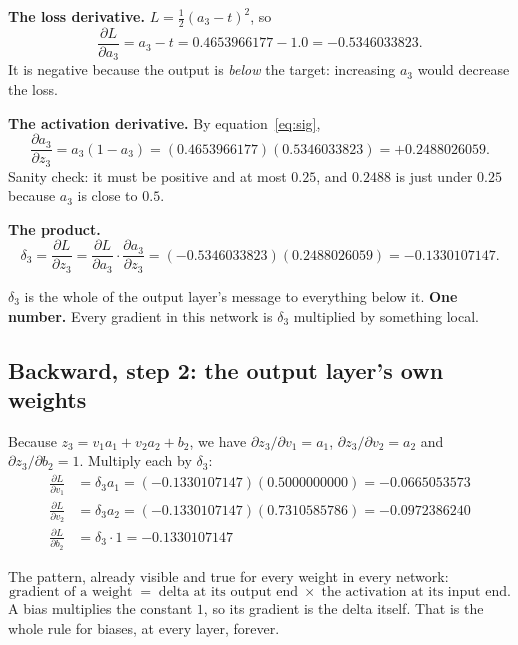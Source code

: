 \documentclass[11pt]{article}
\begin{document}
\begin{worked}[$\delta_3$]
\textbf{The loss derivative.} $L = \tfrac12(a_3 - t)^2$, so
\[
  \frac{\partial L}{\partial a_3} = a_3 - t
  = 0.4653966177 - 1.0 = \mathbf{-0.5346033823}.
\]
It is negative because the output is \emph{below} the target: increasing
$a_3$ would decrease the loss.

\textbf{The activation derivative.} By equation~\eqref{eq:sig},
\[
  \frac{\partial a_3}{\partial z_3} = a_3(1 - a_3)
  = (0.4653966177)(0.5346033823) = \mathbf{+0.2488026059}.
\]
Sanity check: it must be positive and at most $0.25$, and $0.2488$ is just
under $0.25$ because $a_3$ is close to $0.5$.

\textbf{The product.}
\[
  \delta_3 = \frac{\partial L}{\partial z_3}
  = \frac{\partial L}{\partial a_3}\cdot\frac{\partial a_3}{\partial z_3}
  = (-0.5346033823)(0.2488026059) = \mathbf{-0.1330107147}.
\]
\end{worked}

$\delta_3$ is the whole of the output layer's message to everything below it.
\textbf{One number.} Every gradient in this network is $\delta_3$ multiplied
by something local.

\subsection{Backward, step 2: the output layer's own weights}

Because $z_3 = v_1a_1 + v_2a_2 + b_2$, we have $\partial z_3/\partial v_1 =
a_1$, $\partial z_3/\partial v_2 = a_2$ and $\partial z_3/\partial b_2 = 1$.
Multiply each by $\delta_3$:
\begin{align}
  \frac{\partial L}{\partial v_1}
    &= \delta_3 a_1 = (-0.1330107147)(0.5000000000)
     = \mathbf{-0.0665053573}\\
  \frac{\partial L}{\partial v_2}
    &= \delta_3 a_2 = (-0.1330107147)(0.7310585786)
     = \mathbf{-0.0972386240}\\
  \frac{\partial L}{\partial b_2}
    &= \delta_3 \cdot 1 = \mathbf{-0.1330107147}
\end{align}

\begin{keyidea}
The pattern, already visible and true for every weight in every network:
\[
  \text{gradient of a weight} \;=\; \text{delta at its output end}
  \;\times\; \text{the activation at its input end}.
\]
A bias multiplies the constant $1$, so its gradient is the delta itself. That
is the whole rule for biases, at every layer, forever.
\end{keyidea}
\end{document}
